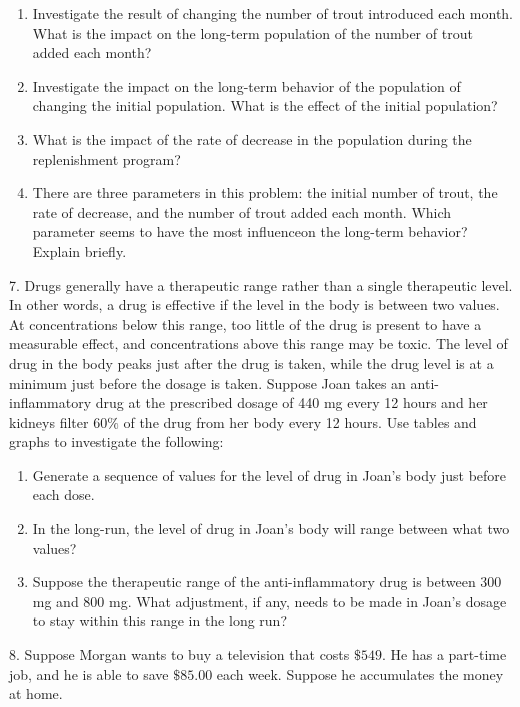 \documentclass[10pt,]{book}
\theoremstyle{plain}
\theoremstyle{definition}
\theoremstyle{definition}
\theoremstyle{definition}
\numberwithin{equation}{section}
\begin{document}
\begin{exerciselist}
\begin{enumerate}[label=(\alph*)]
\item\hypertarget{li-27}{}Investigate the result of changing the number of trout introduced each month.  What is the impact on the long-term population of the number of trout added each month?%
\item\hypertarget{li-28}{}Investigate the impact on the long-term behavior of the population of changing the initial population.  What is the effect of the initial population?%
\item\hypertarget{li-29}{}What is the impact of the rate of decrease in the population during the replenishment program?%
\item\hypertarget{li-30}{}There are three parameters in this problem: the initial number of trout, the rate of decrease, and the number of trout added each month. Which parameter seems to have the most influenceon the long-term behavior? Explain briefly.%
\end{enumerate}
%
\par\smallskip
\item[7.]\hypertarget{exercise-9}{}Drugs generally have a therapeutic range rather than a single therapeutic level.  In other words, a drug is effective if the level in the body is between two values.  At concentrations below this range, too little of the drug is present to have a measurable effect, and concentrations above this range may be toxic.  The level of drug in the body peaks just after the drug is taken, while the drug level is at a minimum just before the dosage is taken.  Suppose Joan takes an anti-inflammatory drug at the prescribed dosage of 440 mg every 12 hours and her kidneys filter \(60\%\) of the drug from her body every 12 hours.  Use tables and graphs to investigate the following: \leavevmode%
\begin{enumerate}[label=(\alph*)]
\item\hypertarget{li-31}{}Generate a sequence of values for the level of drug in Joan’s body just before each dose.%
\item\hypertarget{li-32}{}In the long-run, the level of drug in Joan’s body will range  between what two values?%
\item\hypertarget{li-33}{}Suppose the therapeutic range of the anti-inflammatory drug is between 300 mg and 800 mg.  What adjustment, if any, needs to be made in Joan’s dosage to stay within this range in the long run?%
\end{enumerate}
%
\par\smallskip
\item[8.]\hypertarget{exercise-10}{}Suppose Morgan  wants to buy a television that costs \(\$549\).  He has a part-time job, and he is able to save \(\$85.00\) each week.  Suppose he accumulates the money at home. \leavevmode%

\end{exerciselist}
\end{document}
